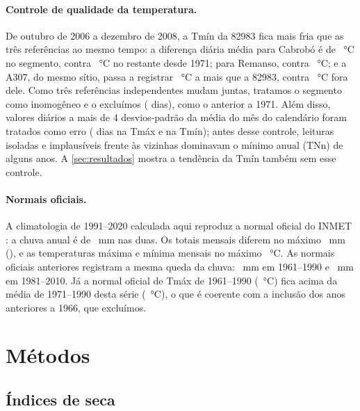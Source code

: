 \documentclass[11pt,a4paper]{article}
\newcommand{\Est}{82983}
\begin{document}
\paragraph{Controle de qualidade da temperatura.}
De outubro de 2006 a dezembro de 2008, a Tmín da \Est{} fica mais fria que as três referências ao mesmo
tempo: a diferença diária média para Cabrobó é de \DifSegTminCabrobo{}~°C no segmento, contra
\DifForaTminCabrobo{}~°C no restante desde 1971; para Remanso, \DifSegTminRemanso{} contra
\DifForaTminRemanso{}~°C; e a A307, do mesmo sítio, passa a registrar \DifSegTminAtres{}~°C a mais que a
\Est{}, contra \DifForaTminAtres{}~°C fora dele. Como três referências independentes mudam juntas,
tratamos o segmento como inomogêneo e o excluímos (\NDiasSegTmin{} dias), como o anterior a 1971.
Além disso, valores diários a mais de 4 desvios-padrão da média do mês do calendário foram tratados
como erro (\NQCTmax{} dias na Tmáx e \NQCTmin{} na Tmín); antes desse controle, leituras isoladas e
implausíveis frente às vizinhas dominavam o mínimo anual (TNn) de alguns anos. A
\cref{sec:resultados} mostra a tendência da Tmín também sem esse controle.

\paragraph{Normais oficiais.}
A climatologia de 1991--2020 calculada aqui reproduz a normal oficial do INMET
\parencite{inmet_normais}: a chuva anual é de \NormalChuva{}~mm nas duas. Os totais mensais diferem no máximo \DifNormalChuvaMensalMax{}~mm
(\MesDifNormalChuva{}), e as temperaturas máxima e mínima mensais no máximo
\DifNormalTempMax{}~°C. As normais oficiais anteriores registram a mesma queda da chuva:
\NormalOficialChuvaSeisUm{}~mm em 1961--1990 e \NormalOficialChuvaOitoUm{}~mm em 1981--2010.
Já a normal oficial de Tmáx de 1961--1990 (\TmaxNormalOficialSeisUm{}~°C) fica acima da média de
1971--1990 desta série (\TmaxSetentaUmNoventa{}~°C), o que é coerente com a inclusão dos anos
anteriores a 1966, que excluímos.

\section{Métodos}\label{sec:metodos}

\subsection{Índices de seca}
\end{document}
